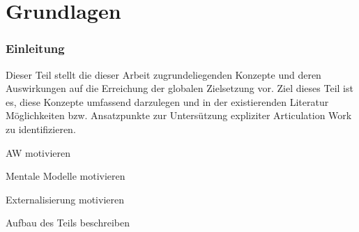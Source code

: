 \part{Grundlagen} %
\label{prt:grundlagen}

\section*{Einleitung} %
\label{sec:grundlagen_einleitung}
\thispagestyle{empty}

Dieser Teil stellt die dieser Arbeit zugrundeliegenden Konzepte und deren Auswirkungen auf die Erreichung der globalen Zielsetzung vor. Ziel dieses Teil ist es, diese Konzepte umfassend darzulegen und in der existierenden Literatur Möglichkeiten bzw. Ansatzpunkte zur Untersützung expliziter Articulation Work zu identifizieren.

AW motivieren

Mentale Modelle motivieren

Externalisierung motivieren

Aufbau des Teils beschreiben





